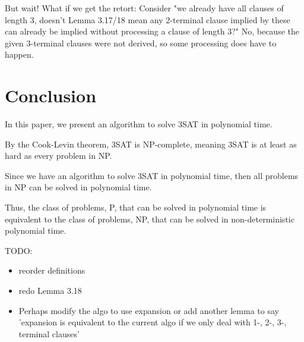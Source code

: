 \documentclass[manuscript]{acmart}
\begin{document}
    But wait! What if we get the retort: 
    Consider "we already have all clauses of length 3, doesn't Lemma 3.17/18 mean
    any 2-terminal clause implied by these can already be implied without 
    processing a clause of length 3?"
    No, because the given 3-terminal clauses were not derived, so some processing
    does have to happen.


    \section{Conclusion} 

    In this paper, we present an algorithm to solve 3SAT in polynomial time.

    By the Cook-Levin theorem, 3SAT is NP-complete, meaning 3SAT is at least
    as hard as every problem in NP.
    
    Since we have an algorithm to solve 3SAT in polynomial time, then all problems
    in NP can be solved in polynomial time.

    Thus, the class of problems, P, that can be solved in polynomial time is
    equivalent to the class of problems, NP, that can be solved in non-deterministic
    polynomial time.


    TODO:
    \begin{itemize}
        \item reorder definitions
        \item redo Lemma 3.18
        \item Perhaps modify the algo to use expansion or add another lemma
        to say 'expansion is equivalent to the current algo if we only deal with
        1-, 2-, 3-, terminal clauses'
    \end{itemize}
\end{document}
